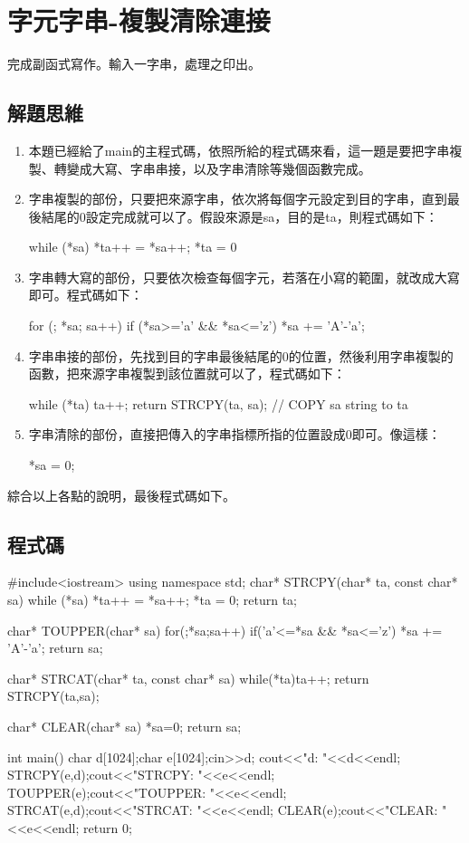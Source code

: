 \section{字元字串-複製清除連接}
完成副函式寫作。輸入一字串，處理之印出。

\subsection{解題思維}

\vspace{0.3cm}
\begin{enumerate}
	\item 本題已經給了main的主程式碼，依照所給的程式碼來看，這一題是要把字串複製、轉變成大寫、字串串接，以及字串清除等幾個函數完成。
	\item 字串複製的部份，只要把來源字串，依次將每個字元設定到目的字串，直到最後結尾的0設定完成就可以了。假設來源是sa，目的是ta，則程式碼如下：
	\begin{inside}
		while (*sa) *ta++ = *sa++;
		*ta = 0
	\end{inside}
	\item 字串轉大寫的部份，只要依次檢查每個字元，若落在小寫的範圍，就改成大寫即可。程式碼如下：
	\begin{inside}
		for (; *sa; sa++) if (*sa>='a' && *sa<='z') *sa += 'A'-'a';
	\end{inside}
	\item 字串串接的部份，先找到目的字串最後結尾的0的位置，然後利用字串複製的函數，把來源字串複製到該位置就可以了，程式碼如下：
	\begin{inside}
		while (*ta) ta++;
		return STRCPY(ta, sa); // COPY sa string to ta
	\end{inside}
	\item 字串清除的部份，直接把傳入的字串指標所指的位置設成0即可。像這樣：
	\begin{inside}
		*sa = 0;
	\end{inside}
\end{enumerate}

綜合以上各點的說明，最後程式碼如下。
\subsection{程式碼}
\begin{cppcode}
#include<iostream>
using namespace std; 
char* STRCPY(char* ta, const char* sa)
{
	while (*sa) *ta++ = *sa++;
	*ta = 0;
	return ta;
}

char* TOUPPER(char* sa)
{
	for(;*sa;sa++) if('a'<=*sa && *sa<='z') *sa += 'A'-'a';
	return sa;
}

char* STRCAT(char* ta, const char* sa)
{
	while(*ta)ta++;
	return STRCPY(ta,sa);
}

char* CLEAR(char* sa)
{
	*sa=0;
	return sa;
}

int main(){ 
	char d[1024];char e[1024];cin>>d;
	cout<<"d: "<<d<<endl;
	STRCPY(e,d);cout<<"STRCPY: "<<e<<endl;
	TOUPPER(e);cout<<"TOUPPER: "<<e<<endl;
	STRCAT(e,d);cout<<"STRCAT: "<<e<<endl;
	CLEAR(e);cout<<"CLEAR: "<<e<<endl;			
	return 0;
}
\end{cppcode}


